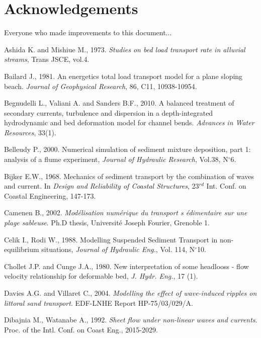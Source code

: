 \section*{Acknowledgements}
Everyone who made improvements to this document...

\pagebreak


\begin{thebibliography}{25}

Ashida K. and Mishiue M., 1973. \emph{Studies on bed load transport
rate in alluvial streams}, Trans JSCE, vol.4.

Bailard J., 1981. An energetics total load transport model
for a plane sloping beach. \emph{Journal of Geophysical Research}, 86, C11,
10938-10954.

Begnudelli L., Valiani A. and Sanders B.F., 2010. A balanced treatment of secondary currents, turbulence and dispersion in a depth-integrated hydrodynamic and bed deformation model for channel bends. \emph{Advances in Water Resources}, 33(1).

Belleudy P., 2000. Numerical simulation of sediment mixture
deposition, part 1: analysis of a flume experiment, \emph{Journal of Hydraulic
Research}, Vol.38, N$^\circ$6.

Bijker E.W., 1968. Mechanics of sediment transport by the
combination of waves and current. In \emph{Design and Reliability of Coastal
Structures}, 23$^{rd}$ Int. Conf. on Coastal Engineering, 147-173.

Camenen B., 2002. \emph{Mod\'{e}lisation num\'{e}rique du transport s%
\'{e}dimentaire sur une plage sableuse}. Ph.D thesis, Universit\'{e}
Joseph Fourier, Grenoble 1.

Celik I., Rodi W., 1988. Modelling Suspended Sediment Transport
in non- equilibrium situations, \emph{Journal of Hydraulic Eng.}, Vol. 114, N$^\circ
$10.

Chollet J.P. and Cunge J.A., 1980. New
interpretation of some headlooss - flow velocity relationship for deformable
bed, \emph{J. Hydr. Eng.}, 17 (1).

Davies A.G. and Villaret C., 2004. \emph{Modelling the effect of
wave-induced ripples on littoral sand transport}. EDF-LNHE Report
HP-75/03/029/A.

Dibajnia M., Watanabe A., 1992. \emph{Sheet flow under non-linear
waves and currents}. Proc. of the Intl. Conf. on Coast Eng., 2015-2029.


\end{thebibliography}
